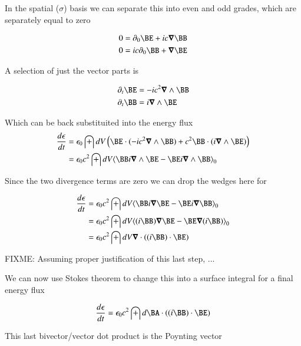 \documentclass{article}
\begin{document}
In the spatial ($\sigma$) basis we can separate this into even and odd grades, which are separately equal to zero

\begin{align*}
0 &= \partial_0 \BE + ic \spacegrad \BB \\
0 &= ic \partial_0 \BB + \spacegrad \BE 
\end{align*}

A selection of just the vector parts is

\begin{align*}
\partial_t \BE &= - ic^2 \spacegrad \wedge \BB \\
\partial_t \BB &= i\spacegrad \wedge \BE 
\end{align*}

Which can be back substituited into the energy flux
\begin{align*}
\frac{d\epsilon}{dt} 
&= \epsilon_0 \int dV \left( \BE \cdot (-i c^2 \spacegrad \wedge \BB) + c^2 \BB \cdot (i \spacegrad \wedge \BE) \right) \\
&= \epsilon_0 c^2 \int dV \gpgradezero{ \BB i \spacegrad \wedge \BE -\BE i \spacegrad \wedge \BB } \\
\end{align*}

Since the two divergence terms are zero we can drop the wedges here for

\begin{align*}
\frac{d\epsilon}{dt} 
&= \epsilon_0 c^2 \int dV \gpgradezero{ \BB i \spacegrad \BE -\BE i \spacegrad \BB } \\
&= \epsilon_0 c^2 \int dV \gpgradezero{ (i \BB) \spacegrad \BE -\BE \spacegrad (i\BB) } \\
&= \epsilon_0 c^2 \int dV \spacegrad \cdot ( (i \BB) \cdot \BE ) \\
\end{align*}

FIXME: Assuming proper justification of this last step, ...

We can now use Stokes theorem to change this into a surface integral for a final energy flux 

\begin{align*}
\frac{d\epsilon}{dt} 
&= \epsilon_0 c^2 \int d\BA \cdot ( (i \BB) \cdot \BE ) \\
\end{align*}

This last bivector/vector dot product is the Poynting vector
\end{document}
